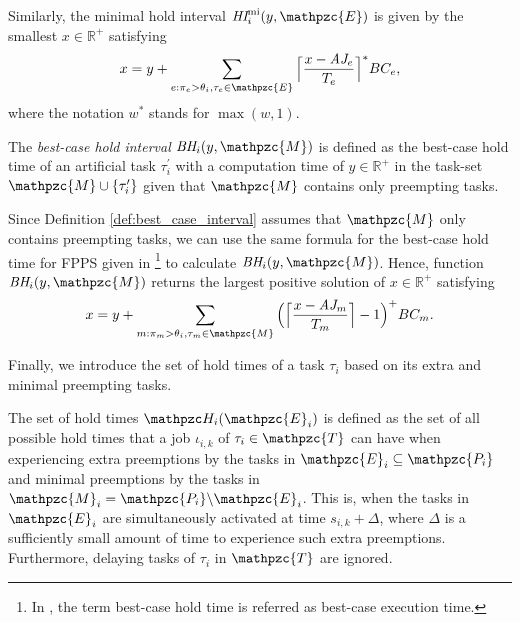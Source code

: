 Similarly, the {minimal hold interval} $\hi^{\rm{mi}}_i(y,\mathpzc{E})$ is given by the smallest $x \in \mathbb{R}^+$ satisfying
\begin{align}
x = y + \sum\limits_{e:\pi_e > \theta_i, \tau_e \in \mathpzc{E}}\Big\lceil  \dfrac{x- \aj_e}{T_e}\Big\rceil^{*}  BC_e,
\end{align}
where the notation $w^*$ stands for $\max(w,1)$.

\begin{definition} \label{def:best_case_interval}
	The \textit{best-case hold interval} $\bh_i(y,\mathpzc{M})$ is defined as the best-case hold time of an artificial task $\tau^{\prime}_i$ with a computation time of $y \in \mathbb{R}^+$ in the task-set $\mathpzc{M}\cup \{\tau^{\prime}_i\}$ given that $\mathpzc{M}$ contains only preempting tasks.
\end{definition}

Since Definition \ref{def:best_case_interval} assumes that $\mathpzc{M}$ only contains preempting tasks, we can use the same formula for the best-case hold time for FPPS given in \cite{BFV08}\footnote{In \cite{BFV08}, the term best-case hold time is referred as best-case execution time.} to calculate $\bh_i(y,\mathpzc{M})$. Hence, function $\bh_i(y,\mathpzc{M})$ returns the largest positive solution of $x \in \mathbb{R}^+$ satisfying
\begin{align} \label{eqn:best_case_hold_interval}
x = y + \sum\limits_{m:\pi_m > \theta_i, \tau_m \in \mathpzc{M}} \Big( \Big\lceil  \dfrac{x-\aj_m}{T_m}\Big\rceil -1 \Big)^+  BC_m.
\end{align}


Finally, we introduce the set of hold times of a task $\tau_i$ based on its extra and minimal preempting tasks.

\begin{definition} \label{def:ht}
	The set of hold times $\hlt_i(\mathpzc{E}_i)$ is defined as the set of all possible hold times that a job $\iota_{i,k}$ of $\tau_i\in \mathpzc{T}$ can have when experiencing extra preemptions by the tasks in $\mathpzc{E}_i \subseteq \mathpzc{P_i}$ and minimal preemptions by the tasks in $\mathpzc{M}_i = \mathpzc{P_i} \backslash \mathpzc{E}_i$. This is, when the tasks in $\mathpzc{E}_i$ are simultaneously activated at time $s_{i,k}+\Delta$, where $\Delta$ is a sufficiently small amount of time to experience such extra preemptions.  Furthermore, delaying tasks of $\tau_i$ in $ \mathpzc{T}$ are ignored.
\end{definition}

